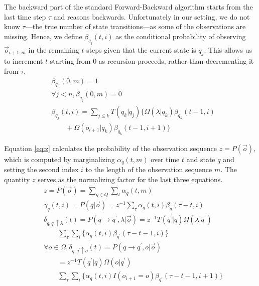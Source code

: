 \documentclass[letterpaper]{article}
\begin{document}
The backward part of the standard Forward-Backward algorithm starts from the last time step $\tau$ and reasons backwards. Unfortunately in our setting, we do not know $\tau$---the true number of state transitions---as some of the observations are missing.  Hence, we define $\beta_{q_j}(t,i)$ as the conditional probability of observing $\vec{o}_{i+1,m}$ in the remaining $t$ steps given that the current state is $q_j$.  This allows us to increment $t$ starting from $0$ as recursion proceeds, rather than decrementing it from $\tau$.
{\footnotesize
\vspace{-.1in}
\begin{align}
&\beta_{q_n}(0,m) = 1 \\
&\forall j < n, \beta_{q_j}(0,m) = 0 \\
&\beta_{q_j}(t,i) = \sum_{j \leq k} T(q_k|q_j) \{ \Omega(\lambda|q_k) \beta_{q_k}(t-1,i) \\  %
&\qquad + \Omega(o_{i+1}|q_k) \beta_{q_k}(t-1,i+1) \} \nonumber %
\end{align}
\vspace{-.2in}
}%

Equation \ref{eq:z} calculates the probability of the observation sequence $z = P(\vec{o})$, which is computed by marginalizing $\alpha_q(t,m)$ over time $t$ and state $q$ and setting the second index $i$ to the length of the observation sequence $m$. The quantity $z$ serves as the normalizing factor for the last three equations.
{\footnotesize
\begin{align}
&z = P(\vec{o}) = \sum_{q \in Q} \sum_{t} \alpha_{q}(t,m) \label{eq:z}\\
&\gamma_q(t,i) = P(q | \vec{o}) = z^{-1} \sum_{\tau} \alpha_q(t,i) \beta_q(\tau-t,i) \label{eq:gamma}\\
&\delta_{q,q^\prime \uparrow \lambda}(t) = P(q \rightarrow q^\prime,\lambda | \vec{o}) = z^{-1}T(q^\prime | q) \Omega(\lambda |q^\prime) \label{eq:delta1}\\
&\qquad \sum_{\tau} \sum_i \{ \alpha_q(t,i) \beta_{q^\prime}(\tau-t-1,i) \} \nonumber\\
&\forall o \in \Omega, \delta_{q,q^\prime \uparrow o}(t) = P(q \rightarrow q^\prime,o | \vec{o}) \label{eq:delta2}\\
&\qquad = z^{-1}T(q^\prime | q) \Omega(o | q^\prime) \nonumber\\
&\qquad \sum_{\tau} \sum_i \{ \alpha_q(t,i) I(o_{i+1}=o) \beta_{q^\prime}(\tau-t-1,i+1) \} \nonumber
\end{align}
\vspace{-.1in}
}%
\end{document}
